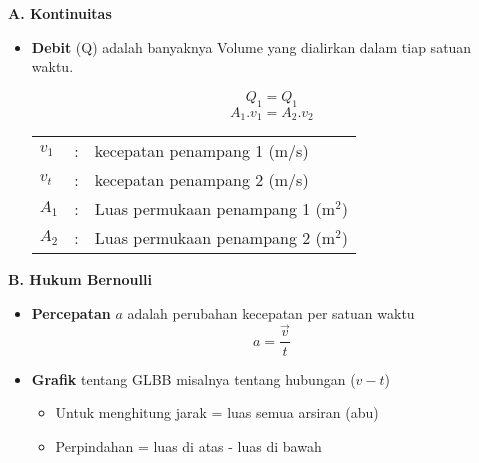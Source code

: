\documentclass[10pt,a4paper]{article}
\begin{document}
\begin{multicols*}{2}
\begin{catatan}\textbf{A. Kontinuitas}\end{catatan}
\begin{itemize}[itemsep=0mm,topsep=0mm,leftmargin=*]
\item \textbf{Debit} (Q) adalah banyaknya Volume yang dialirkan dalam tiap satuan waktu. 

\begin{rumus}
$$ Q_1 = Q_1 $$
$$A_1.v_1 = A_2.v_2$$
\begin{tabular}{lll}
$v_1$ &:&kecepatan penampang 1 (m/s) \\
$v_t$ &:&kecepatan penampang 2 (m/s) \\
$A_1$ &:&Luas permukaan penampang 1 (m$^2$) \\
$A_2$ &:&Luas permukaan penampang 2 (m$^2$) \\
\end{tabular}
\end{rumus}

\end{itemize}

\begin{catatan}
\textbf{B. Hukum Bernoulli}
\end{catatan}
\begin{itemize}[itemsep=0mm,topsep=0mm,leftmargin=*]
\item \textbf{Percepatan} $a$ adalah perubahan kecepatan per satuan waktu $$a = \frac{\vec{v}}{t}$$

\item \textbf{Grafik} tentang GLBB misalnya tentang hubungan ($v-t$) 
\begin{itemize}[label=*, topsep=0mm, itemsep=0mm]
\item Untuk menghitung jarak = luas semua arsiran (abu)
\item Perpindahan = luas di atas - luas di bawah 
\end{itemize}


\end{itemize}
\end{multicols*}
\end{document}
